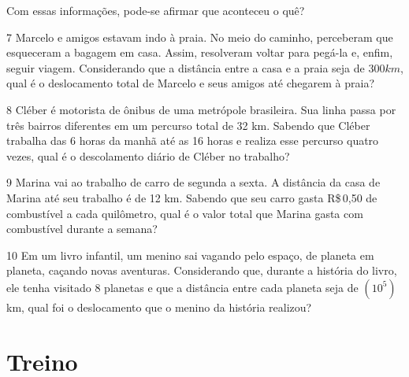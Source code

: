 Com essas informações, pode-se afirmar que aconteceu o quê?



\num{7} Marcelo e amigos estavam indo à praia. No meio do caminho,
perceberam que esqueceram a bagagem em casa. Assim, resolveram voltar
para pegá-la e, enfim, seguir viagem.
Considerando que a distância entre a casa e a praia seja de $300 km$, qual
é o deslocamento total de Marcelo e seus amigos até chegarem à praia?



\num{8} Cléber é motorista de ônibus de uma metrópole brasileira. Sua linha
passa por três bairros diferentes em um percurso total de 32 km. Sabendo que
Cléber trabalha das 6 horas da manhã até as 16 horas e realiza esse
percurso quatro vezes, qual é o descolamento diário de Cléber no trabalho?


\num{9} Marina vai ao trabalho de carro de segunda a sexta. A distância da
casa de Marina até seu trabalho é de 12 km. Sabendo que seu carro gasta
R\$\,0,50 de combustível a cada quilômetro, qual é o valor total que Marina
gasta com combustível durante a semana?


\num{10} Em um livro infantil, um menino sai vagando pelo espaço, de planeta
em planeta, caçando novas aventuras. Considerando que, durante a
história do livro, ele tenha visitado 8 planetas e que a distância
entre cada planeta seja de $(10^5)$ km, qual foi o deslocamento que o
menino da história realizou?





\section*{Treino}

